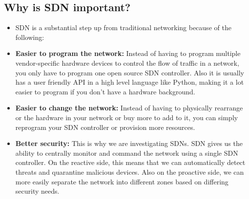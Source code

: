 \documentclass{article}
\begin{document}
\subsection{Why is SDN important?}
\begin{itemize}
    \item SDN is a substantial step up from traditional networking because of the following:
    \item \textbf{Easier to program the network:} Instead of having to program multiple vendor-specific hardware devices to control the flow of traffic in a network, you only have to program one open source SDN controller. Also it is usually has a user friendly API in a high level language like Python, making it a lot easier to program if you don't have a hardware background.
    \item \textbf{Easier to change the network:} Instead of having to physically rearrange or the hardware in your network or buy more to add to it, you can simply reprogram your SDN controller or provision more resources.
    \item \textbf{Better security:} This is why we are investigating SDNs. SDN gives us the ability to centrally monitor and command the network using a single SDN controller. On the reactive side, this means that we can automatically detect threats and quarantine malicious devices. Also on the proactive side, we can more easily separate the network into different zones based on differing security needs.
\end{itemize}
\end{document}
